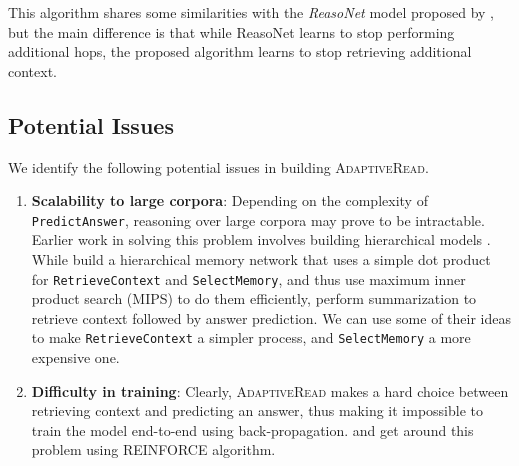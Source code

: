 This algorithm shares some similarities with the \textit{ReasoNet} model
proposed by \cite{shen2016reasonet}, but the main difference is that while ReasoNet learns to
stop performing additional hops, the proposed algorithm learns to stop retrieving additional context.

\subsection{Potential Issues}
We identify the following potential issues in building \textsc{AdaptiveRead}.
\begin{enumerate}
 \item \textbf{Scalability to large corpora}: Depending on the complexity of \texttt{PredictAnswer}, reasoning
 over large corpora may prove to be intractable. Earlier work in solving this problem involves building
 hierarchical models \cite{chandar2016hierarchical,choi2016hierarchical}. While \cite{chandar2016hierarchical}
 build a hierarchical memory network that uses a simple dot product for \texttt{RetrieveContext} and \texttt{SelectMemory},
 and thus use maximum inner product search (MIPS) to do them efficiently, \cite{choi2016hierarchical} perform summarization
 to retrieve context followed by answer prediction. We can use some of their ideas to make \texttt{RetrieveContext} a simpler
 process, and \texttt{SelectMemory} a more expensive one.
 
 \item \textbf{Difficulty in training}: Clearly, \textsc{AdaptiveRead} makes a hard choice between retrieving context and
 predicting an answer, thus making it impossible to train the model end-to-end using back-propagation. \cite{shen2016reasonet}
 and \cite{choi2016hierarchical} get around this problem using REINFORCE \cite{williams1992simple} algorithm.
\end{enumerate}


